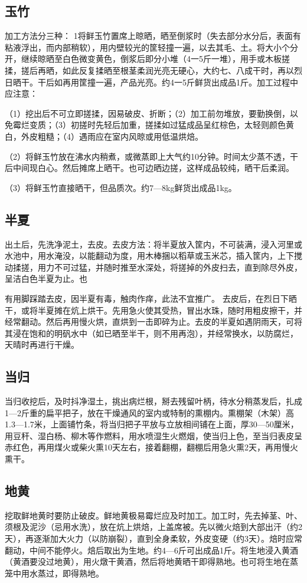 \documentclass{ctexbook}
\begin{document}
\subsection{玉竹}
加工方法分三种：
1将鲜玉竹置席上晾晒，晒至倒浆时（失去部分水分后，表面有粘液浮出，而内部稍软），用内壁较光的筐轻撞一遍，以去其毛、土。将大小个分开，继续晾晒至白色微变黄色，倒浆后即分小堆（4一5斤一堆），用手或木板搓揉，搓后再晒，如此反复揉晒至根茎柔润光亮无硬心，大约七、八成干时，再以烈日晒干。干后如再用筐撞一遍，产品光亮。约4一5斤鲜货出成品1斤。加工过程中应注意：

（1）挖出后不可立即搓揉，因易破皮、折断；（2）加工前勿堆放，要勤换倒，以免霉烂变质；（3）初搓时先轻后加重，搓揉如过猛成品呈红棕色，太轻则颜色黄白，外皮粗糙；（4）遇雨应在室内风晾或用低温烘焙。

（2）将鲜玉竹放在沸水内稍煮，或微蒸即上大气约10分钟。时间太少蒸不透，干后中间现白心。然后摊席上晒干。也可边晒边搓，这样成品较纯，晒干后柔润。

（3）将鲜玉竹直接晒干，但品质次。约7—8kg鲜货出成品1kg。

\subsection{半夏}
出土后，先洗净泥土，去皮。去皮方法：将半夏放入筐内，不可装满，浸入河里或水池中，用水淹没，以能翻动为度，用木棒捆以稻草或玉米芯，插入筐内，上下搅动揉搓，用力不可过猛，并随时推至水深处，将搓掉的外皮扫去，直到除尽外皮，呈洁白色半夏为止。也

有用脚踩踏去皮，因半夏有毒，触肉作痒，此法不宜推广。
去皮后，在烈日下晒干，或将半夏摊在炕上烘干。先用急火使其受热，冒出水珠，随时用粗皮擦干，并经常翻动。然后再用慢火烘，直烘到一击即碎为止。去皮的半夏如遇阴雨天，可将其浸在饱和的明矾水中（如已晒至半干，则不用再泡），并经常换水，以防腐烂，天晴时再进行干燥。
\subsection{当归}
当归收挖后，及时抖净湿土，挑出病烂根，掰去残留叶柄，待水分稍蒸发后，扎成1—2斤重的扁平把子，放在干燥通风的室内或特制的熏棚内。熏棚架（木架）高1.3—1.7米，上面铺竹条，将当归把子平放与立放相间铺在上面，厚30—50厘米，用豆秆、湿白杨、柳木等作燃料，用水喷湿生火燃烟，使当归上色，至当归表皮呈赤红色，再用煤火或柴火熏10天左右，接着翻棚，翻棚后用急火熏2天，再用慢火熏干。
\subsection{地黄}
挖取鲜地黄时要防止破皮。鲜地黄极易霉烂应及时加工。加工时，先去掉茎、叶、须根及泥沙（忌用水洗），放在炕上烘焙，上盖席被。先以微火焙到大部出汗（约2天），再逐渐加大火力（以防崩裂），直到全身柔软，外皮变硬（约3天）。焙时应常翻动，中间不能停火。焙后取出为生地。约4—6斤可出成品1斤。将生地浸入黄酒（黄酒要没过地黄），用火燉干黄酒，然后将地黄晒干即得熟地。也可将生地在蒸笼中用水蒸过，即得熟地。
\end{document}
